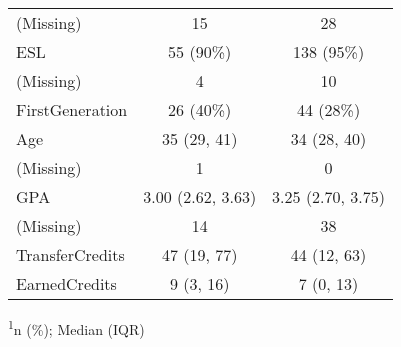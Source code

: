 \begin{appendix}
\begin{longtable}{lcc}
(Missing) & 15 & 28 \\ 
ESL & 55 (90\%) & 138 (95\%) \\ 
(Missing) & 4 & 10 \\ 
FirstGeneration & 26 (40\%) & 44 (28\%) \\ 
Age & 35 (29, 41) & 34 (28, 40) \\ 
(Missing) & 1 & 0 \\ 
GPA & 3.00 (2.62, 3.63) & 3.25 (2.70, 3.75) \\ 
(Missing) & 14 & 38 \\ 
TransferCredits & 47 (19, 77) & 44 (12, 63) \\ 
EarnedCredits & 9 (3, 16) & 7 (0, 13) \\ 
\bottomrule
\end{longtable}
\begin{minipage}{\linewidth}
\textsuperscript{1}n (\%); Median (IQR)\\
\end{minipage}
\end{appendix}
